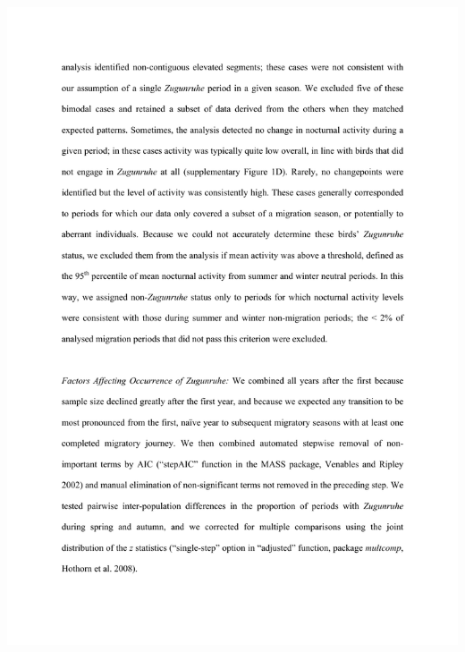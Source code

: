 \documentclass[a4paper, twoside]{templates/ociamthesis}
\begin{document}
\includegraphics[width=1\linewidth]{pdf_chapters/zug/zug_supp_crop_Part06}
\end{document}
